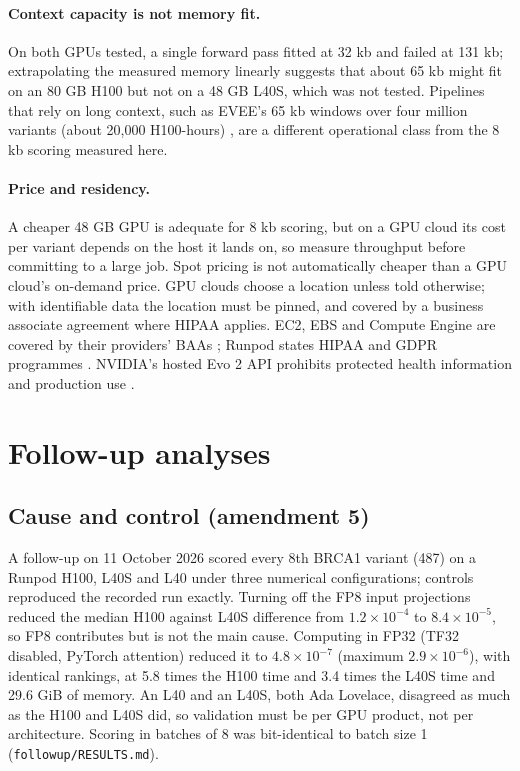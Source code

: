 \documentclass[11pt]{article}
\newcommand{\code}[1]{\texttt{#1}}
\begin{document}
\paragraph{Context capacity is not memory fit.} On both GPUs tested, a single forward pass fitted at
32 kb and failed at 131 kb; extrapolating the measured memory linearly suggests that about 65 kb
might fit on an 80 GB H100 but not on a 48 GB L40S, which was not tested. Pipelines that rely on long context, such as EVEE's 65 kb windows over four million
variants (about 20,000 H100-hours) \cite{evee2026}, are a different operational class from the
8 kb scoring measured here.

\paragraph{Price and residency.} A cheaper 48 GB GPU is adequate for 8 kb scoring, but on a GPU cloud
its cost per variant depends on the host it lands on, so measure throughput before committing to
a large job. Spot pricing is not automatically cheaper than a GPU cloud's
on-demand price. GPU clouds choose a location unless told otherwise; with identifiable data the
location must be pinned, and covered by a business associate agreement where HIPAA applies. EC2,
EBS and Compute Engine are covered by their providers' BAAs \cite{awshipaa,gcphipaa}; Runpod states
HIPAA and GDPR programmes \cite{runpodcompliance}. NVIDIA's hosted Evo 2 API prohibits protected
health information and production use \cite{nvidiatrial}.

\section{Follow-up analyses}\label{sec:followup}
\subsection{Cause and control (amendment 5)}
A follow-up on 11 October 2026 scored every 8th BRCA1 variant (487) on a Runpod H100, L40S and L40
under three numerical configurations; controls reproduced the recorded run exactly. Turning off
the FP8 input projections reduced the median H100 against L40S difference from $1.2\times10^{-4}$
to $8.4\times10^{-5}$, so FP8 contributes but is not the main cause. Computing in FP32 (TF32
disabled, PyTorch attention) reduced it to $4.8\times10^{-7}$ (maximum $2.9\times10^{-6}$), with
identical rankings, at 5.8 times the H100 time and 3.4 times the L40S time and 29.6 GiB of memory.
An L40 and an L40S, both Ada Lovelace, disagreed as much as the H100 and L40S did, so validation
must be per GPU product, not per architecture. Scoring in batches of 8 was bit-identical to batch
size 1 (\code{followup/RESULTS.md}).
\end{document}
